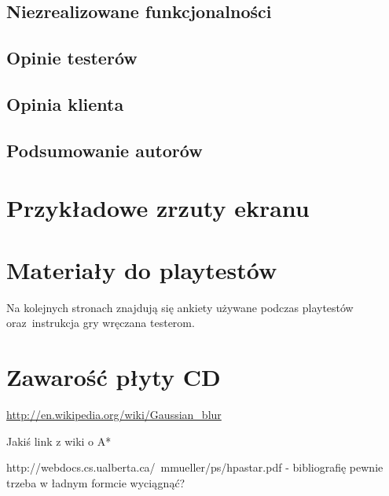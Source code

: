\documentclass[licencjacka]{pracamgr}
\begin{document}
  \section{Niezrealizowane funkcjonalności}

  \section{Opinie testerów}

  \section{Opinia klienta}

  \section{Podsumowanie autorów}

\appendix

  \chapter{Przykładowe zrzuty ekranu}

  \chapter{Materiały do playtestów}
  Na kolejnych stronach znajdują się ankiety używane podczas playtestów
  oraz~instrukcja gry wręczana testerom.

    
    
    

  \chapter{Zawarość płyty CD}


\begin{thebibliography}{99}
  \item{\url{http://en.wikipedia.org/wiki/Gaussian_blur}}
  \item{Jakiś link z wiki o A*}
  \item{http://webdocs.cs.ualberta.ca/~mmueller/ps/hpastar.pdf - bibliografię pewnie trzeba w ładnym formcie wyciągnąć?}

\end{thebibliography}
\end{document}
